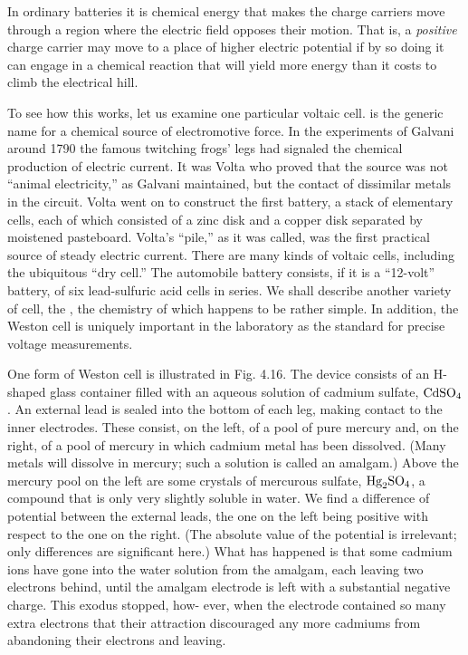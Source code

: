 In ordinary batteries it is chemical energy that makes the charge
carriers move through a region where the electric field opposes their
motion. That is, a \emph{positive} charge carrier may move to a place of
higher electric potential if by so doing it can engage in a chemical
reaction that will yield more energy than it costs to climb the electrical
hill.

To see how this works, let us examine one particular voltaic cell.
 is the generic name for a chemical source of electromotive
force. In the experiments of Galvani around 1790 the famous
twitching frogs' legs had signaled the chemical production of electric
current. It was Volta who proved that the source was not ``animal
electricity,'' as Galvani maintained, but the contact of dissimilar
metals in the circuit. Volta went on to construct the first battery, a
stack of elementary cells, each of which consisted of a zinc disk and
a copper disk separated by moistened pasteboard. Volta's ``pile,'' as
it was called, was the first practical source of steady electric current.
There are many kinds of voltaic cells, including the ubiquitous ``dry
cell.'' The automobile battery consists, if it is a ``12-volt'' battery, of
six lead-sulfuric acid cells in series. We shall describe another
variety of cell, the , the chemistry of which
happens to be rather simple. In addition, the Weston cell is uniquely
important in the laboratory as the standard for precise voltage
measurements.

One form of Weston cell is illustrated in Fig. 4.16. The device
consists of an H-shaped glass container filled with an aqueous solution
of cadmium sulfate, $\textup{CdSO}_4$. An external lead is sealed into the
bottom of each leg, making contact to the inner electrodes. These
consist, on the left, of a pool of pure mercury and, on the right, of a
pool of mercury in which cadmium metal has been dissolved.
(Many metals will dissolve in mercury; such a solution is called an
amalgam.) Above the mercury pool on the left are some crystals of
mercurous sulfate, $\textup{Hg}_2\textup{SO}_4$, a compound that is only very slightly
soluble in water. We find a difference of potential between the external
leads, the one on the left being positive with respect to the one
on the right. (The absolute value of the potential is irrelevant; only
differences are significant here.) What has happened is that some
cadmium ions have gone into the water solution from the amalgam,
each leaving two electrons behind, until the amalgam electrode is
left with a substantial negative charge. This exodus stopped, how-
ever, when the electrode contained so many extra electrons that their
attraction discouraged any more cadmiums from abandoning their
electrons and leaving.

